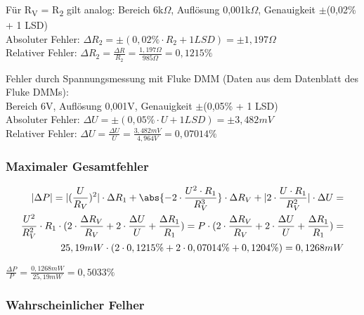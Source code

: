 Für R\textsubscript{V} = R\textsubscript{2} gilt analog:
Bereich 6k$\Omega$, Auflösung 0,001k$\Omega$, Genauigkeit $\pm$(0,02\% + 1 LSD)\\
Absoluter Fehler: $\Delta R_2 = \pm (0,02\% \cdot R_2 + 1 LSD) = \pm 1,197\Omega$\\
Relativer Fehler: $\Delta R_2 = \frac{\Delta R}{R_2} = \frac{1,197 \Omega}{985 \Omega} = 0,1215\%$\par

Fehler durch Spannungsmessung mit Fluke DMM (Daten aus dem Datenblatt des Fluke DMMs):\\
Bereich 6V, Auflösung 0,001V, Genauigkeit $\pm$(0,05\% + 1 LSD)\\
Absoluter Fehler: $\Delta U = \pm (0,05\% \cdot U + 1 LSD) = \pm 3,482 mV$\\
Relativer Fehler: $\Delta U = \frac{\Delta U}{U} = \frac{3,482 mV}{4,964 V} = 0,07014\%$\\

\subsubsection{Maximaler Gesamtfehler}
\[
    \begin{aligned}
    |\Delta P| = |(\frac{U}{R_V})^2| \cdot \Delta R_1 + \abs{-2 \cdot \frac{U^2 \cdot R_1}{R_V^3}} \cdot \Delta R_V + |2 \cdot \frac{U \cdot R_1 }{R_V^2}| \cdot \Delta U = \\
    \frac{U^2}{R_V^2} \cdot R_1 \cdot (2 \cdot \frac{\Delta R_V}{R_V} + 2 \cdot \frac{\Delta U}{U} + \frac{\Delta R_1}{R_1}) = 
    P \cdot (2 \cdot \frac{\Delta R_V}{R_V} + 2 \cdot \frac{\Delta U}{U} + \frac{\Delta R_1}{R_1}) = \\
    25,19 mW \cdot (2 \cdot 0,1215\% + 2 \cdot 0,07014\% + 0,1204\%)  = 0,1268 mW
    \end{aligned}
\]

$\frac{\Delta P}{P} = \frac{0,1268 mW}{25,19 mW} = 0,5033\%$

\subsubsection{Wahrscheinlicher Felher}

